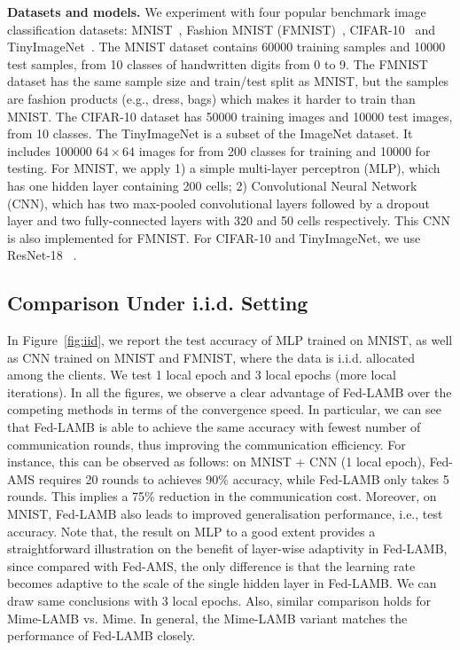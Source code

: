 \documentclass[nohyperref]{article}
\theoremstyle{plain}
\theoremstyle{definition}
\theoremstyle{remark}
\begin{document}
\noindent\textbf{Datasets and models.} We experiment with four popular benchmark image classification datasets: MNIST~\citep{lecun1998mnist}, Fashion MNIST (FMNIST)~\citep{xiao2017fashion}, CIFAR-10~\citep{krizhevsky2009learning} and TinyImageNet~\citep{deng2009imagenet}. The MNIST dataset contains 60000 training samples and 10000 test samples, from 10 classes of handwritten digits from 0 to 9. The FMNIST dataset has the same sample size and train/test split as MNIST, but the samples are fashion products (e.g., dress, bags) which makes it harder to train than MNIST. The CIFAR-10 dataset has 50000 training images and 10000 test images, from 10 classes. The TinyImageNet is a subset of the ImageNet dataset. It includes 100000 $64\times 64$ images for from 200 classes for training and 10000 for testing. For MNIST, we apply 1) a simple multi-layer perceptron (MLP), which has one hidden layer containing 200 cells; 2) Convolutional Neural Network (CNN), which has two max-pooled convolutional layers followed by a dropout layer and two fully-connected layers with 320 and 50 cells respectively. This CNN is also implemented for FMNIST. 
For CIFAR-10 and TinyImageNet, we use ResNet-18 ~\cite{Proc:He-resnet16}.



\vspace{-0.07in}
\subsection{Comparison Under i.i.d. Setting}
\vspace{-0.02in}

In Figure~\ref{fig:iid}, we report the test accuracy of MLP trained on MNIST, as well as CNN trained on MNIST and FMNIST, where the data is i.i.d. allocated among the clients. We test 1 local epoch and 3 local epochs (more local iterations). In all the figures, we observe a clear advantage of Fed-LAMB over the competing methods in terms of the convergence speed. In particular, we can see that Fed-LAMB is able to achieve the same accuracy with fewest number of communication rounds, thus improving the communication efficiency. For instance, this can be observed as follows: on MNIST + CNN (1 local epoch), Fed-AMS requires 20 rounds to achieves 90\% accuracy, while Fed-LAMB only takes 5 rounds. This implies a 75\% reduction in the communication cost. Moreover, on MNIST, Fed-LAMB also leads to improved generalisation performance, i.e., test accuracy. Note that, the result on MLP to a good extent provides a straightforward illustration on the benefit of layer-wise adaptivity in Fed-LAMB, since compared with Fed-AMS, the only difference is that the learning rate becomes adaptive to the scale of the single hidden layer in Fed-LAMB. We can draw same conclusions with 3 local epochs. Also, similar comparison holds for Mime-LAMB vs. Mime. In general, the Mime-LAMB variant matches the performance of Fed-LAMB closely. 
\end{document}
